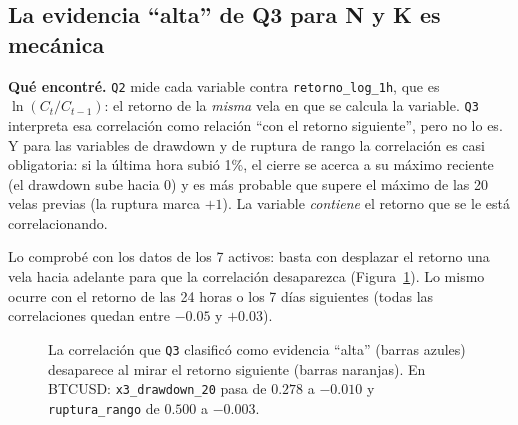 \documentclass[11pt,a4paper]{article}
\newcommand{\code}[1]{\texttt{\small #1}}
\begin{document}
\subsection{La evidencia ``alta'' de Q3 para N y K es mecánica}\label{sec:mecanica}

\textbf{Qué encontré.} \code{Q2} mide cada variable contra \code{retorno\_log\_1h}, que es
$\ln(C_t/C_{t-1})$: el retorno de la \emph{misma} vela en que se calcula la variable. \code{Q3}
interpreta esa correlación como relación ``con el retorno siguiente'', pero no lo es. Y para las
variables de drawdown y de ruptura de rango la correlación es casi obligatoria: si la última hora subió
1\%, el cierre se acerca a su máximo reciente (el drawdown sube hacia 0) y es más probable que supere el
máximo de las 20 velas previas (la ruptura marca $+1$). La variable \emph{contiene} el retorno que se
le está correlacionando.

Lo comprobé con los datos de los 7 activos: basta con desplazar el retorno una vela hacia adelante para
que la correlación desaparezca (Figura~\ref{fig:mecanica}). Lo mismo ocurre con el retorno de las 24
horas o los 7 días siguientes (todas las correlaciones quedan entre $-0.05$ y $+0.03$).

\begin{figure}[h]
\centering
{}
\caption{La correlación que \code{Q3} clasificó como evidencia ``alta'' (barras azules) desaparece al
mirar el retorno siguiente (barras naranjas). En BTCUSD: \code{x3\_drawdown\_20} pasa de $0.278$ a
$-0.010$ y \code{ruptura\_rango} de $0.500$ a $-0.003$.}
\label{fig:mecanica}
\end{figure}
\end{document}

